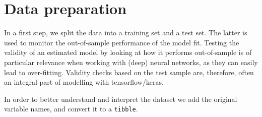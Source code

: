 \documentclass[
  12pt,
]{style/krantz}
\newenvironment{Shaded}{\begin{snugshade}}{\end{snugshade}}
\newcommand{\CommentTok}[1]{\textcolor[rgb]{0.56,0.35,0.01}{\textit{#1}}}
\newcommand{\FunctionTok}[1]{\textcolor[rgb]{0.00,0.00,0.00}{#1}}
\newcommand{\NormalTok}[1]{#1}
\newcommand{\SpecialCharTok}[1]{\textcolor[rgb]{0.00,0.00,0.00}{#1}}
\begin{document}
\hypertarget{data-preparation-1}{%
\section{Data preparation}\label{data-preparation-1}}

In a first step, we split the data into a training set and a test set. The latter is used to monitor the out-of-sample performance of the model fit. Testing the validity of an estimated model by looking at how it performs out-of-sample is of particular relevance when working with (deep) neural networks, as they can easily lead to over-fitting. Validity checks based on the test sample are, therefore, often an integral part of modelling with tensorflow/keras.

\begin{Shaded}
\end{Shaded}

In order to better understand and interpret the dataset we add the original variable names, and convert it to a \texttt{tibble}.
\end{document}
